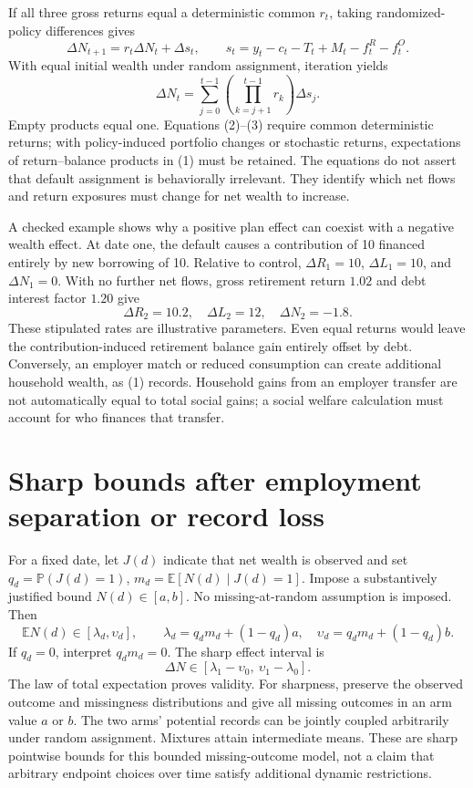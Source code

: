 \documentclass[11pt]{article}
\newcommand{\E}{\mathbb{E}}
\newcommand{\Pp}{\mathbb{P}}
\begin{document}
If all three gross returns equal a deterministic common $r_t$, taking
randomized-policy differences gives
\[
 \Delta N_{t+1}=r_t\Delta N_t+\Delta s_t,\qquad
 s_t=y_t-c_t-T_t+M_t-f_t^R-f_t^O.                         \tag{2}
\]
With equal initial wealth under random assignment, iteration yields
\[
 \Delta N_t=\sum_{j=0}^{t-1}
       \left(\prod_{k=j+1}^{t-1}r_k\right)\Delta s_j.     \tag{3}
\]
Empty products equal one. Equations (2)--(3) require common deterministic
returns; with policy-induced portfolio changes or stochastic returns,
expectations of return--balance products in (1) must be retained.
The equations do not assert that default assignment is behaviorally
irrelevant. They identify which net flows and return exposures must change
for net wealth to increase.

A checked example shows why a positive plan effect can coexist with a
negative wealth effect. At date one, the default causes a contribution of
10 financed entirely by new borrowing of 10. Relative to control,
$\Delta R_1=10$, $\Delta L_1=10$, and $\Delta N_1=0$.
With no further net flows, gross retirement return $1.02$ and debt interest
factor $1.20$ give
\[
 \Delta R_2=10.2,\quad\Delta L_2=12,\quad\Delta N_2=-1.8.
\]
These stipulated rates are illustrative parameters. Even equal returns
would leave the contribution-induced retirement balance gain entirely
offset by debt. Conversely, an employer match or reduced consumption can
create additional household wealth, as (1) records. Household gains from
an employer transfer are not automatically equal to total social gains;
a social welfare calculation must account for who finances that transfer.

\section{Sharp bounds after employment separation or record loss}
For a fixed date, let $J(d)$ indicate that net wealth is observed and set
$q_d=\Pp(J(d)=1)$, $m_d=\E[N(d)\mid J(d)=1]$. Impose a substantively
justified bound $N(d)\in[a,b]$. No missing-at-random assumption is imposed.
Then
\[
 \E N(d)\in[\lambda_d,\upsilon_d],\qquad
 \lambda_d=q_dm_d+(1-q_d)a,\quad
 \upsilon_d=q_dm_d+(1-q_d)b.                             \tag{4}
\]
If $q_d=0$, interpret $q_dm_d=0$. The sharp effect interval is
\[
 \Delta N\in[\lambda_1-\upsilon_0,\
             \upsilon_1-\lambda_0].                    \tag{5}
\]
The law of total expectation proves validity. For sharpness, preserve the
observed outcome and missingness distributions and give all missing
outcomes in an arm value $a$ or $b$. The two arms' potential records can
be jointly coupled arbitrarily under random assignment. Mixtures attain
intermediate means. These are sharp pointwise bounds for this bounded
missing-outcome model, not a claim that arbitrary endpoint choices over
time satisfy additional dynamic restrictions.
\end{document}

